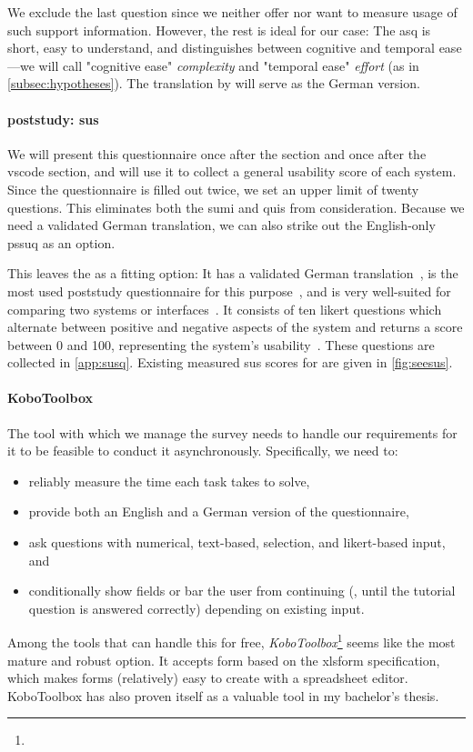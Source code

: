 \documentclass[../thesis]{subfiles}
\begin{document}
We exclude the last question since we neither offer nor want to measure usage of such support information.
However, the rest is ideal for our case:
The \gls{asq} is short, easy to understand, and distinguishes between cognitive and temporal ease---we will call "cognitive ease" \emph{complexity} and "temporal ease" \emph{effort} (as in \cref{subsec:hypotheses}).
The translation by \textcite[32]{roegele2020} will serve as the German version.

\paragraph{\Gls{poststudy}: \gls{sus}}
We will present this questionnaire once after the \SEE{} section and once after the \gls{vscode} section, and will use it to collect a general usability score of each system.
Since the questionnaire is filled out twice, we set an upper limit of twenty questions.
This eliminates both the \gls{sumi} and \gls{quis} from consideration.
Because we need a validated German translation, we can also strike out the English-only \gls{pssuq} as an option.

This leaves the \emph{} as a fitting option:
It has a validated German translation~\cite{reinhardt2015}, is the most used \gls{poststudy} questionnaire for this purpose~\cites[1615]{sauro2009}[577]{lewis2018}, and is very well-suited for comparing two systems or interfaces~\cites[195]{peres2013}[590--591]{bangor2008}.
It consists of ten \gls{likert} questions which alternate between positive and negative aspects of the system and returns a score between 0 and 100, representing the system's usability~\cite{brooke1996}.
These questions are collected in \cref{app:susq}.
Existing measured \gls{sus} scores for \SEE{} are given in \cref{fig:seesus}.

\paragraph{KoboToolbox}
The tool with which we manage the survey needs to handle our requirements for it to be feasible to conduct it asynchronously.
Specifically, we need to:
\begin{itemize}
	\item reliably measure the time each task takes to solve,
	\item provide both an English and a German version of the questionnaire,
	\item ask questions with numerical, text-based, selection, and \gls{likert}-based input, and
	\item conditionally show fields or bar the user from continuing (\eg, until the tutorial question is answered correctly) depending on existing input.
\end{itemize}
Among the tools that can handle this for free, \textit{KoboToolbox}\footnote{
} seems like the most mature and robust option.
It accepts form based on the \gls{xlsform} specification, which makes forms (relatively) easy to create with a spreadsheet editor.
KoboToolbox has also proven itself as a valuable tool in my bachelor's thesis.
\end{document}
